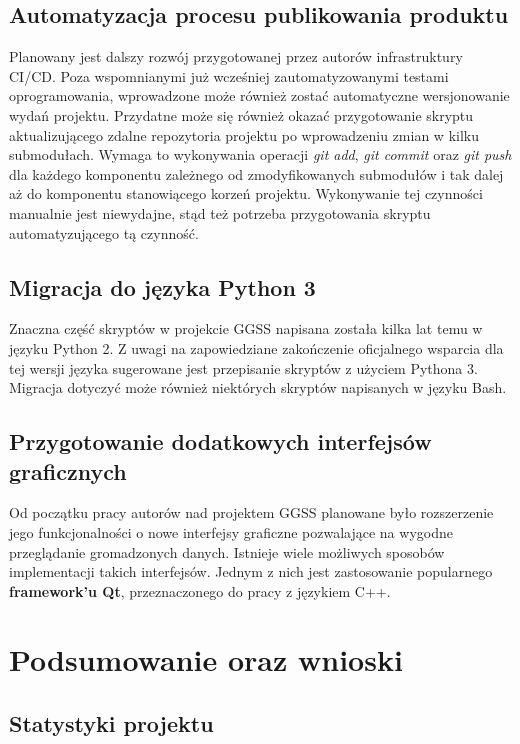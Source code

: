 \section{Automatyzacja procesu publikowania produktu}
Planowany jest dalszy rozwój przygotowanej przez autorów infrastruktury CI/CD. Poza wspomnianymi już wcześniej zautomatyzowanymi testami oprogramowania, wprowadzone może również zostać automatyczne wersjonowanie wydań projektu. Przydatne może się również okazać przygotowanie skryptu aktualizującego zdalne repozytoria projektu po wprowadzeniu zmian w kilku submodułach. Wymaga to wykonywania operacji \textit{git add}, \textit{git commit} oraz \textit{git push} dla każdego komponentu zależnego od zmodyfikowanych submodułów i tak dalej aż do komponentu stanowiącego korzeń projektu. Wykonywanie tej czynności manualnie jest niewydajne, stąd też potrzeba przygotowania skryptu automatyzującego tą czynność.


\section{Migracja do języka Python 3}
Znaczna część skryptów w projekcie GGSS napisana została kilka lat temu w języku Python 2. Z uwagi na zapowiedziane zakończenie oficjalnego wsparcia dla tej wersji języka sugerowane jest przepisanie skryptów z użyciem Pythona 3. Migracja dotyczyć może również niektórych skryptów napisanych w języku Bash. 

\section{Przygotowanie dodatkowych interfejsów graficznych}
Od początku pracy autorów nad projektem GGSS planowane było rozszerzenie jego funkcjonalności o nowe interfejsy graficzne pozwalające na wygodne przeglądanie gromadzonych danych. Istnieje wiele możliwych sposobów implementacji takich interfejsów. Jednym z nich jest zastosowanie popularnego \textbf{framework'u Qt}, przeznaczonego do pracy z językiem C++. 


\chapter{Podsumowanie oraz wnioski}
\label{cha:summary}

\section{Statystyki projektu}
\label{sec:stat}

